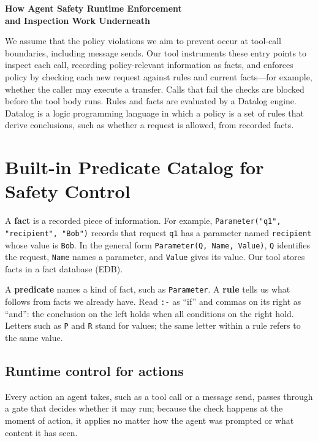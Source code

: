 \documentclass[11pt,letter]{article}
\begin{document}
\begin{center}
  {\LARGE\bfseries How Agent Safety Runtime Enforcement\\[2pt]
   and Inspection Work Underneath}
\end{center}
\vspace{-5pt}

We assume that the policy violations we aim to prevent occur at tool-call
boundaries, including message sends. Our tool instruments these entry points
to inspect each call, recording policy-relevant information as facts, and
enforces policy by checking each new request against rules and current
facts---for example, whether the caller may execute a transfer. Calls that
fail the checks are blocked before the tool body runs. Rules and facts are
evaluated by a Datalog engine. Datalog is a logic programming language in
which a policy is a set of rules that derive conclusions, such as whether a
request is allowed, from recorded facts.

\section{Built-in Predicate Catalog for Safety Control}


A \textbf{fact} is a recorded piece of information. For example,
\texttt{Parameter("q1", "recipient", "Bob")} records that request
\texttt{q1} has a parameter named \texttt{recipient} whose value is \texttt{Bob}.
In the general form \texttt{Parameter(Q, Name, Value)}, \texttt{Q} identifies
the request, \texttt{Name} names a parameter, and \texttt{Value} gives its value.
Our tool stores facts in a fact database (EDB).

A \textbf{predicate} names a kind of fact, such as \texttt{Parameter}.
A \textbf{rule} tells us what follows from facts we already have.
Read \texttt{:-} as ``if'' and commas on its right as ``and'': the conclusion
on the left holds when all conditions on the right hold. Letters such as
\texttt{P} and \texttt{R} stand for values; the same letter within a rule
refers to the same value.

\subsection*{Runtime control for actions}
Every action an agent takes, such as a tool call or a message send, passes
through a gate that decides whether it may run; because the check happens at
the moment of action, it applies no matter how the agent was prompted or what
content it has seen.
\end{document}
